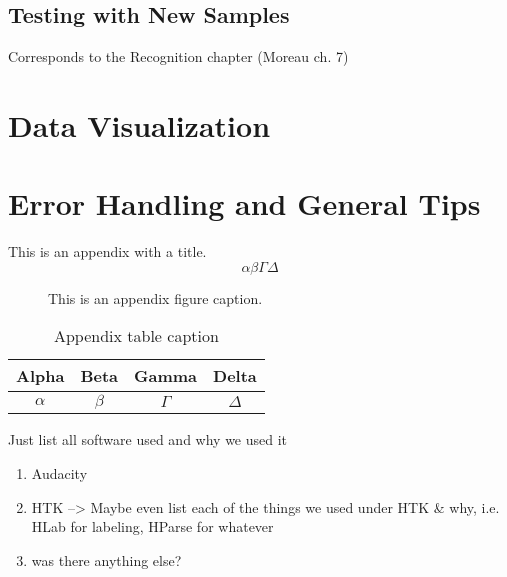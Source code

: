 \documentclass{wileySev}
\begin{document}
\chapter{Testing with New Samples}
Corresponds to the Recognition chapter (Moreau ch. 7)


\part{Data Visualization}

\part{Error Handling and General Tips}

This is an appendix with a title.
\begin{equation}
\alpha\beta\Gamma\Delta
\end{equation}



\begin{figure}[ht]
\caption{This is an appendix figure caption.}
\end{figure}


\begin{table}[ht]
\caption{Appendix table caption}
\centering
\begin{tabular}{cccc}
\hline
Alpha&Beta&Gamma&Delta\\
\hline
$\alpha$&$\beta$&$\Gamma$&$\Delta$\\
\hline
\end{tabular}
\end{table}

Just list all software used and why we used it
\begin{enumerate}
\item Audacity
\item HTK --> Maybe even list each of the things we used under HTK \& why, i.e. HLab for labeling, HParse for whatever
\item was there anything else?
\end{enumerate}
\end{document}
